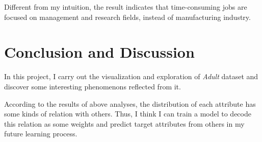 \documentclass[12pt,a4paper]{article}
\theoremstyle{definition}
\begin{document}
Different from my intuition, the result indicates that time-consuming jobs are focused on management and research fields, instead of manufacturing industry.

\section{Conclusion and Discussion}
In this project, I carry out the visualization and exploration of \textit{Adult} dataset and discover some interesting phenomenons reflected from it.

According to the results of above analyses, the distribution of each attribute has some kinds of relation with others. Thus, I think I can train a model to decode this relation as some weights and predict target attributes from others in my future learning process.
\end{document}
